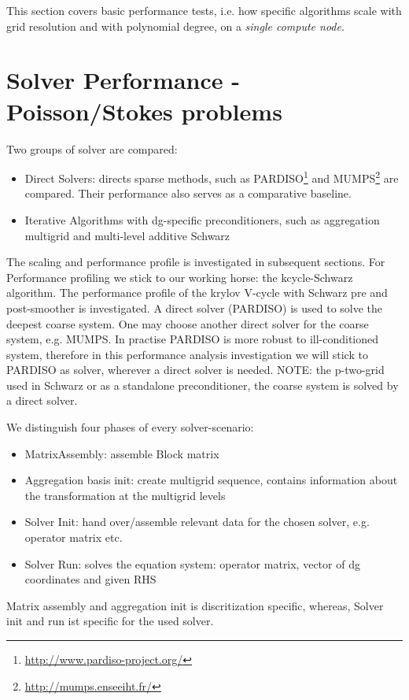 This section covers basic performance tests, i.e. how specific algorithms scale
with grid resolution and with polynomial degree, on a \emph{single compute node}.




\section{Solver Performance - Poisson/Stokes problems}
\label{sec:SolverPerformancePoisson}
Two groups of solver are compared:
\begin{itemize}
\item
Direct Solvers: directs sparse methods, such as PARDISO\footnote{
\url{http://www.pardiso-project.org/}}
and MUMPS\footnote{
\url{http://mumps.enseeiht.fr/}}
are compared.
Their performance also serves as a comparative baseline.


\item
Iterative Algorithms with \ac{dg}-specific preconditioners, such as aggregation multigrid
and multi-level additive Schwarz
\end{itemize}

The scaling and performance profile is investigated in subsequent sections. For Performance profiling we stick to our working horse: the kcycle-Schwarz algorithm.
The performance profile of the krylov V-cycle with Schwarz pre and post-smoother is investigated. A direct solver (PARDISO) is used to solve the deepest coarse system. One may choose another direct solver for the coarse system, e.g. MUMPS. In practise PARDISO is more robust to ill-conditioned system, therefore in this performance analysis investigation we will stick to PARDISO as solver, wherever a direct solver is needed.
NOTE: the p-two-grid used in Schwarz or as a standalone preconditioner, the coarse system is solved by a direct solver.

We distinguish four phases of every solver-scenario: 
\begin{itemize}
	\item MatrixAssembly: assemble Block matrix
	\item Aggregation basis init: create multigrid sequence, contains information about the transformation at the multigrid levels
	\item Solver Init: hand over/assemble relevant data for the chosen solver, e.g. operator matrix etc.
	\item Solver Run: solves the equation system: operator matrix, vector of dg coordinates and given RHS 
\end{itemize}
Matrix assembly and aggregation init is discritization specific, whereas, Solver init and run ist specific for the used solver.

